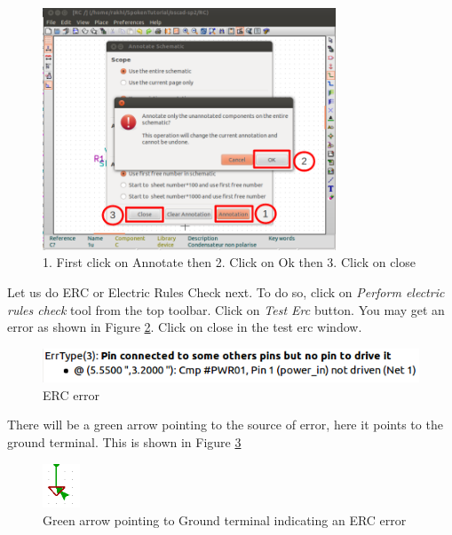 \begin{figure}
\centering
\includegraphics[width=0.78\textwidth]{figures/anno}
\caption{1. First click on Annotate then 2. Click on Ok then 3. Click on close}
\label{anno}
\end{figure}
Let us do ERC or Electric Rules Check next. To do so, click on \textit{Perform electric rules check} tool from the top toolbar. Click on \textit{Test Erc} button. You may get an error as shown in Figure \ref{erc}. Click on close in the test erc window.
\begin{figure}
\centering
\includegraphics[width=\textwidth]{figures/erc1}
\caption{ERC error}
\label{erc}
\end{figure}
There will be a green arrow pointing to the source of error, here it points to the ground terminal. This is shown in Figure \ref{ercgnd}
\begin{figure}
\centering
\includegraphics[width=0.1\textwidth]{figures/ercgnd}
\caption{Green arrow pointing to Ground terminal indicating an ERC error}
\label{ercgnd}
\end{figure}

